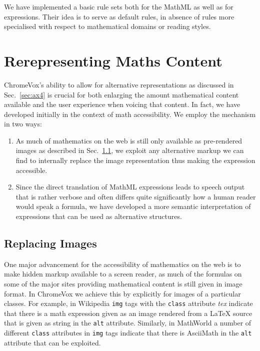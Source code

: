 \documentclass{acm_proc_article-sp}
\begin{document}
We have implemented a basic rule sets both for the MathML as well as for 
expressions. Their idea is to serve as default rules, in absence of rules more
specialised with respect to mathematical domains or reading styles.



\section{Rerepresenting Maths Content}
\label{sec:alternative}

ChromeVox's ability to allow for alternative representations as discussed in
Sec.~\ref{sec:ax4} is crucial for both enlarging the amount mathematical content
available and the user experience when voicing that content. In fact, we have
developed initially in the context of math accessibility.  We employ the
mechanism in two ways:
\begin{enumerate}
\item As much of mathematics on the web is still only available as
  pre-rendered images as described in Sec.~\ref{sec:images}, we exploit any
  alternative markup we can find to internally replace the image representation
  thus making the expression accessible.
\item Since the direct translation of MathML expressions leads to speech output
  that is rather verbose and often differs quite significantly how a human
  reader would speak a formula, we have developed a more semantic interpretation
  of expressions that can be used as alternative structures.
\end{enumerate}

\subsection{Replacing Images}
\label{sec:images}

One major advancement for the accessibility of mathematics on the web is to make
hidden markup available to a screen reader, as much of the formulas on some of
the major sites providing mathematical content is still given in image format.
In ChromeVox we achieve this by explicitly for images of a particular classes.
For example, in Wikipedia \texttt{img} tags with the \texttt{class} attribute
\emph{tex} indicate that there is a math expression given as an image rendered
from a {\LaTeX} source that is given as string in the \texttt{alt} attribute.
Similarly, in MathWorld a number of different \texttt{class} attributes in
\texttt{img} tags indicate that there is AsciiMath in the \texttt{alt} attribute
that can be exploited.
\end{document}
